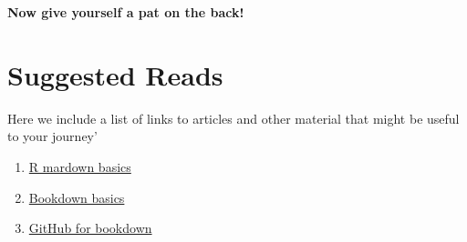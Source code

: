 \documentclass[
]{book}
\providecommand{\tightlist}{%
  \setlength{\itemsep}{0pt}\setlength{\parskip}{0pt}}
\begin{document}
\textbf{Now give yourself a pat on the back!}

\hypertarget{suggested-reads}{%
\chapter{Suggested Reads}\label{suggested-reads}}

Here we include a list of links to articles and other material that might be useful to your journey'

\begin{enumerate}
\def\labelenumi{\arabic{enumi}.}
\tightlist
\item
  \href{https://bookdown.org/yihui/rmarkdown/}{R mardown basics}
\item
  \href{https://bookdown.org/yihui/bookdown/}{Bookdown basics}
\item
  \href{https://bookdown.org/yihui/bookdown/github.html}{GitHub for bookdown}
\end{enumerate}

  
\end{document}
